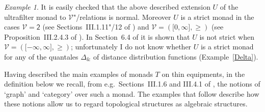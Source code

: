 \documentclass[preprint, a4paper]{elsarticle}
\theoremstyle{definition}
\theoremstyle{remark}
\newtheorem{example}[theorem]{Example}
\providecommand{\exref}[1]{Example~\ref{#1}}
\providecommand{\brks}[1]{\lbrack #1 \rbrack}
\newcommand{\tn}{\mathbin\&}
\providecommand{\catvar}[1]{\mathcal{#1}}
\providecommand{\2}{\mathsf 2}
\providecommand{\V}{\catvar V}
\begin{document}
\begin{example}
		It is easily checked that the above described extension $U$ of the ultrafilter monad to $\V$"/relations is normal. Moreover $U$ is a strict monad in the cases $\V = \2$ (see Sections~III.1.11"/12 of \cite{Hofmann-Seal-Tholen14}) and $\V = (\brks{0, \infty}, \geq)$ (see Proposition~III.2.4.3 of \cite{Hofmann-Seal-Tholen14}). In Section~6.4 of \cite{Clementino-Hofmann04} it is shown that $U$ is not strict when $\V = (\brks{-\infty, \infty}, \geq)$; unfortunately I do not know whether $U$ is a strict monad for any of the quantales $\Delta_{\tn}$ of distance distribution functions (\exref{Delta}).
	\end{example}
	
	Having described the main examples of monads $T$ on thin equipments, in the definition below we recall, from e.g.\ Sections~III.1.6 and III.4.1 of \cite{Hofmann-Seal-Tholen14}, the notions of `graph' and `category' over such a monad. The examples that follow describe how these notions allow us to regard topological structures as algebraic structures.
\end{document}
